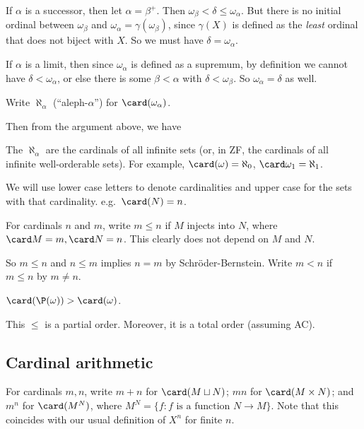 \documentclass[a4paper]{article}
\begin{document}
If $\alpha$ is a successor, then let $\alpha = \beta^+$. Then $\omega_\beta < \delta \leq \omega_\alpha$. But there is no initial ordinal between $\omega_\beta$ and $\omega_\alpha = \gamma(\omega_\beta)$, since $\gamma(X)$ is defined as the \emph{least} ordinal that does not biject with $X$. So we must have $\delta = \omega_\alpha$.

If $\alpha$ is a limit, then since $\omega_\alpha$ is defined as a supremum, by definition we cannot have $\delta < \omega_\alpha$, or else there is some $\beta < \alpha$ with $\delta < \omega_\beta$. So $\omega_\alpha = \delta$ as well.

\begin{defi}\index{$\aleph_\alpha$}
  Write $\aleph_\alpha$ (``aleph-$\alpha$'') for $\card(\omega_\alpha)$.
\end{defi}

Then from the argument above, we have
\begin{thm}
  The $\aleph_\alpha$ are the cardinals of all infinite sets (or, in ZF, the cardinals of all infinite well-orderable sets). For example, $\card(\omega) = \aleph_0$, $\card \omega_1 = \aleph_1$.
\end{thm}

We will use lower case letters to denote cardinalities and upper case for the sets with that cardinality. e.g.\ $\card(N) = n$.

\begin{defi}
  For cardinals $n$ and $m$, write $m \leq n$ if $M$ injects into $N$, where $\card M = m, \card N = n$. This clearly does not depend on $M$ and $N$.

  So $m \leq n$ and $n\leq m$ implies $n = m$ by Schr\"oder-Bernstein. Write $m < n$ if $m \leq n$ by $m\not = n$.
\end{defi}

\begin{eg}
  $\card(\P(\omega)) > \card(\omega)$.
\end{eg}

This $\leq$ is a partial order. Moreover, it is a total order (assuming AC).

\subsection{Cardinal arithmetic}
\begin{defi}
  For cardinals $m, n$, write $m + n$ for $\card(M\sqcup N)$; $mn$ for $\card(M\times N)$; and $m^n$ for $\card(M^N)$, where $M^N = \{f: f\text{ is a function }N\to M\}$. Note that this coincides with our usual definition of $X^n$ for finite $n$.
\end{defi}
\end{document}
